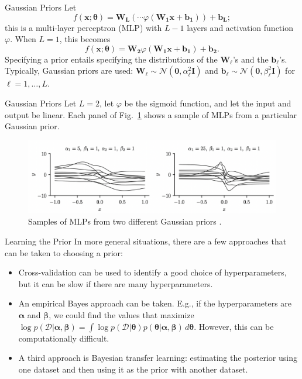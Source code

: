 \documentclass{beamer}
\begin{document}
\begin{frame}{Gaussian Priors}
    Let
    \[
    f(\boldsymbol{x}; \boldsymbol{\theta}) = \boldsymbol{W_L}(\cdots\varphi(\boldsymbol{W_1}\boldsymbol{x} + \boldsymbol{b_1})) + \boldsymbol{b_L};
    \]
    this is a multi-layer perceptron (MLP) with $L - 1$ layers and activation function $\varphi$. When $L = 1$, this becomes
    \[
    f(\boldsymbol{x}; \boldsymbol{\theta}) = \boldsymbol{W_2}\varphi(\boldsymbol{W_1}\boldsymbol{x} + \boldsymbol{b_1}) + \boldsymbol{b_2}.
    \]
    Specifying a prior entails specifying the distributions of the $\boldsymbol{W}_{\ell}$'s and the $\boldsymbol{b}_{\ell}$'s. Typically, Gaussian priors are used: $\boldsymbol{W}_{\ell} \sim \mathcal{N}(\boldsymbol{0}, \alpha_{\ell}^2\boldsymbol{I})$ and $\boldsymbol{b}_{\ell} \sim \mathcal{N}(\boldsymbol{0}, \beta_{\ell}^2\boldsymbol{I})$ for $\ell = 1, \ldots, L$.
\end{frame}

\begin{frame}{Gaussian Priors}
    Let $L = 2$, let $\varphi$ be the sigmoid function, and let the input and output be linear. Each panel of Fig.~\ref{fig:mlp_priors} shows a sample of MLPs from a particular Gaussian prior.
    \begin{figure}
        \centering
        \includegraphics[width=\textwidth]{mlp_priors}
        \caption{Samples of MLPs from two different Gaussian priors \cite{pml2Book}.}
        \label{fig:mlp_priors}
    \end{figure}
\end{frame}

\begin{frame}{Learning the Prior}
    In more general situations, there are a few approaches that can be taken to choosing a prior:
    \begin{itemize}
        \item Cross-validation can be used to identify a good choice of hyperparameters, but it can be slow if there are many hyperparameters.
        \item An empirical Bayes approach can be taken. E.g., if the hyperparameters are $\boldsymbol{\alpha}$ and $\boldsymbol{\beta}$, we could find the values that maximize $\log p(\mathcal{D} | \boldsymbol{\alpha}, \boldsymbol{\beta}) = \int \log p(\mathcal{D} | \boldsymbol{\theta})p(\boldsymbol{\theta} | \boldsymbol{\alpha}, \boldsymbol{\beta})\,d\boldsymbol{\theta}$. However, this can be computationally difficult.
        \item A third approach is Bayesian transfer learning: estimating the posterior using one dataset and then using it as the prior with another dataset.
    \end{itemize}
\end{frame}
\end{document}
